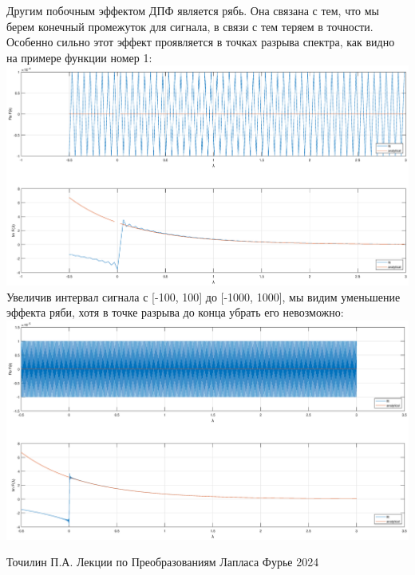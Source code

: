 \documentclass[11pt]{article}
\begin{document}
Другим побочным эффектом ДПФ является рябь. Она связана с тем, что мы берем конечный промежуток для сигнала, в связи с тем теряем в точности. Особенно сильно этот эффект проявляется в точках разрыва спектра, как видно на примере функции номер 1:
\includegraphics[width=1\textwidth]{f1.eps}
Увеличив интервал сигнала с [-100, 100] до [-1000, 1000], мы видим уменьшение эффекта ряби, хотя в точке разрыва до конца убрать его невозможно:
\newline
\includegraphics[width=1\textwidth]{f1_1.eps}
\begin{thebibliography}{99}
 Точилин П.А. Лекции по Преобразованиям Лапласа Фурье 2024
\end{thebibliography}
\end{document}
